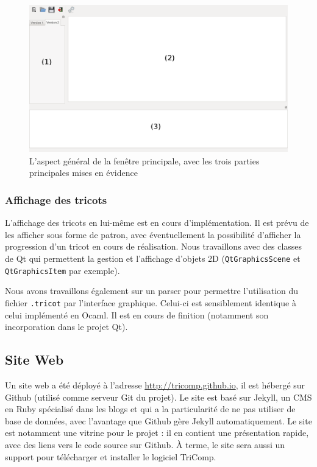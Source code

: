 \documentclass{article}
\begin{document}
\begin{figure}[!ht]
  \begin{center}
    \includegraphics[scale=0.3]{fenetre.png}
  \end{center}
  \caption{L'aspect général de la fenêtre principale, avec les trois parties principales mises en évidence}
  \label{fenetre}
\end{figure}

\subsubsection{Affichage des tricots}

L'affichage des tricots en lui-même est en cours d'implémentation. Il est prévu de les afficher sous forme de patron, avec éventuellement
la possibilité d'afficher la progression d'un tricot en cours de réalisation.
Nous travaillons avec des classes de Qt qui permettent la gestion et l'affichage d'objets 2D (\texttt{QtGraphicsScene} et \texttt
{QtGraphicsItem} par exemple).

Nous avons travaillons également sur un parser pour permettre l'utilisation du fichier \texttt{.tricot} par l'interface graphique. Celui-ci est 
sensiblement identique à celui implémenté en Ocaml. Il est en cours de finition (notamment son incorporation dans le projet Qt).

\subsection{Site Web}

Un site web a été déployé à l'adresse \url{http://tricomp.github.io}, il est hébergé sur Github (utilisé comme serveur Git du projet). Le
site est basé sur Jekyll, un CMS en Ruby spécialisé dans les blogs et qui a la particularité de ne pas utiliser de base de données, avec
l'avantage que Github gère Jekyll automatiquement. Le site est notamment une vitrine pour le projet : il en contient une présentation
rapide, avec des liens vers le code source sur Github. À terme, le site sera aussi un support pour télécharger et installer le logiciel
TriComp.
\end{document}
